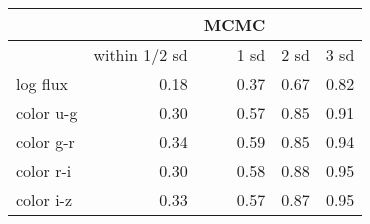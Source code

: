 \begin{tabular}{lrrrr}
{} &  &  \textbf{MCMC} &  & \\
\toprule
{} & within 1/2 sd &  1 sd &  2 sd &  3 sd \\
\midrule
log flux &         0.18 & 0.37 & 0.67 & 0.82 \\
color u-g   &         0.30 & 0.57 & 0.85 & 0.91 \\
color g-r   &         0.34 & 0.59 & 0.85 & 0.94 \\
color r-i   &         0.30 & 0.58 & 0.88 & 0.95 \\
color i-z   &         0.33 & 0.57 & 0.87 & 0.95 \\
\bottomrule
\end{tabular}

